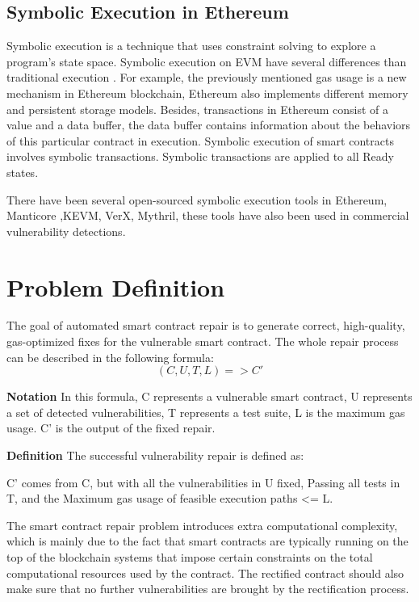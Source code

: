 \documentclass[sigplan,screen]{acmart}
\begin{document}
\subsection{Symbolic Execution in Ethereum}

Symbolic execution is a technique that uses constraint solving to explore a program's state space. Symbolic execution on EVM have several differences than traditional execution \cite{mossberg2019manticore} . For example, the previously mentioned gas usage is a new mechanism in Ethereum blockchain, Ethereum also implements different memory and persistent storage models. Besides, transactions in Ethereum consist of a value and a data buffer, the data buffer contains information about the behaviors of this particular contract in execution. Symbolic execution of smart contracts involves symbolic transactions. Symbolic transactions are applied to all Ready states.

There have been several open-sourced symbolic execution tools in Ethereum, Manticore \cite{mossberg2019manticore},KEVM\cite{hildenbrandt2017kevm}, VerX\cite{permenev2020verx}, Mythril\cite{mythril}, these tools have also been used in commercial vulnerability detections. 

\section{Problem Definition}

The goal of automated smart contract repair is to generate correct, high-quality, gas-optimized fixes for the vulnerable smart contract. The whole repair process can be described in the following formula:
$$
(C, U, T, L) => C'
$$

\textbf{Notation}
In this formula, C represents a vulnerable smart contract, U represents a set of detected vulnerabilities, T represents a test suite, L is the maximum gas usage. C' is the output of the fixed repair. 

\textbf{Definition} The successful vulnerability repair is defined as:

C' comes from C, but with all the vulnerabilities in U fixed, Passing all tests in T, and the Maximum gas usage of feasible execution paths <= L.

The smart contract repair problem introduces extra computational complexity, which is mainly due to the fact that smart contracts are typically running on the top of the blockchain systems that impose certain constraints on the total computational resources used by the contract. The rectified contract should also make sure that no further vulnerabilities are brought by the rectification process.
\end{document}
